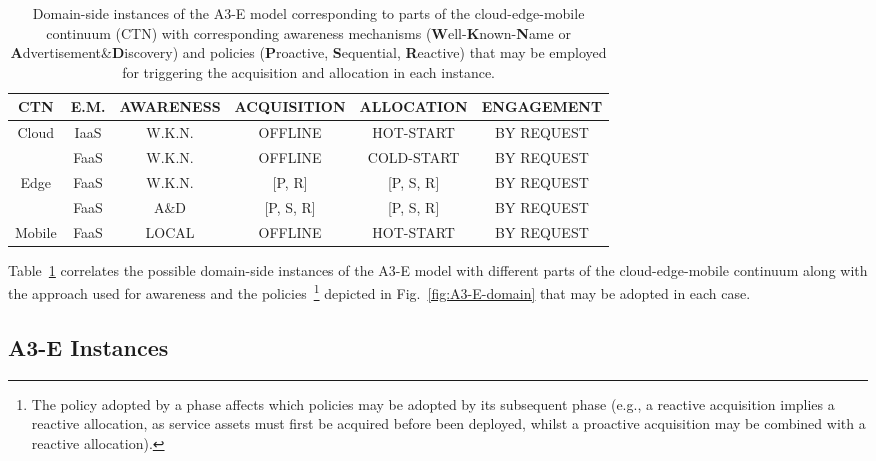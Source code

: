 \begin{center}
\begin{table}[htbp]
\small
\caption{Domain-side instances of the A3-E model corresponding to parts of the cloud-edge-mobile continuum (CTN) with corresponding awareness mechanisms (\textbf{W}ell-\textbf{K}nown-\textbf{N}ame or \textbf{A}dvertisement\&\textbf{D}iscovery) and policies (\textbf{P}roactive, \textbf{S}equential, \textbf{R}eactive) that may be employed for triggering the acquisition and allocation in each instance. }\label{tab:A3-E-instances}
\begin{tabular}{ c c c c c c }
\toprule

CTN & E.M. & \textbf{A}WARENESS & \textbf{A}CQUISITION	& \textbf{A}LLOCATION 	& \textbf{E}NGAGEMENT  	\\

\midrule

\multirow{2}{*}{ Cloud }
& IaaS	& W.K.N.	& OFFLINE		& HOT-START	& BY REQUEST\\
& FaaS		& W.K.N.	& OFFLINE		& COLD-START	& BY REQUEST\\\midrule					
\multirow{2}{*}{ Edge }
& FaaS		& W.K.N.	& [P, R]		& [P, S, R] 	& BY REQUEST\\
& FaaS		& A\&D	& [P, S, R]		& [P, S, R]		& BY REQUEST\\\midrule	
\multirow{1}{*}{ Mobile }
& FaaS	& LOCAL  & OFFLINE	& HOT-START 	& BY REQUEST\\

\bottomrule
\end{tabular}
\end{table}
\end{center}
\normalsize

Table~\ref{tab:A3-E-instances} correlates the possible domain-side instances of the A3-E model with different parts of the cloud-edge-mobile continuum along with the approach used for awareness and the policies~\footnote{The policy adopted by a phase affects which policies may be adopted by its subsequent phase (e.g., a reactive acquisition implies a reactive allocation, as service assets must first be acquired before been deployed, whilst a proactive acquisition may be combined with a reactive allocation).} depicted in Fig.~\ref{fig:A3-E-domain} that may be adopted in each case. 


\subsection{A3-E Instances}

